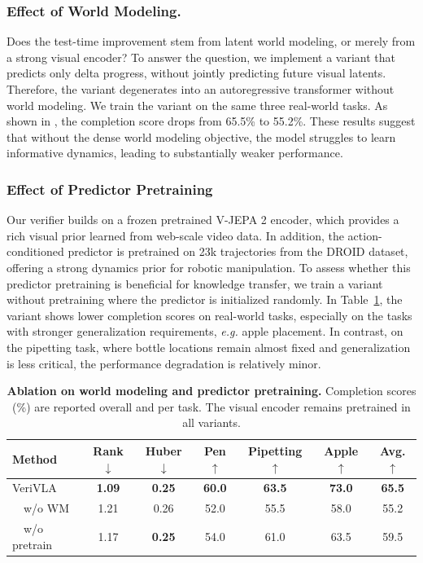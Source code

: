 \documentclass[10pt,twocolumn,letterpaper]{article}
\begin{document}
\subsubsection{Effect of World Modeling.}

Does the test-time improvement stem from latent world modeling, or merely from a strong visual encoder? To answer the question, we implement a variant that predicts only delta progress, without jointly predicting future visual latents. Therefore, the variant degenerates into an autoregressive transformer without world modeling.
We train the variant on the same three real-world tasks. As shown in , the completion score drops from 65.5\% to 55.2\%. These results suggest that without the dense world modeling objective, the model struggles to learn informative dynamics, leading to substantially weaker performance.


\subsubsection{Effect of Predictor Pretraining}
Our verifier builds on a frozen pretrained V-JEPA 2 encoder, which provides a rich visual prior learned from web-scale video data. In addition, the action-conditioned predictor is pretrained on 23k trajectories from the DROID dataset, offering a strong dynamics prior for robotic manipulation. To assess whether this predictor pretraining is beneficial for knowledge transfer, we train a variant without pretraining where the predictor is initialized randomly.
In Table~\ref{tab:ablation}, the variant shows lower completion scores on real-world tasks, especially on the tasks with stronger generalization requirements, \textit{e.g.} apple placement. In contrast, on the pipetting task, where bottle locations remain almost fixed and generalization is less critical, the performance degradation is relatively minor.

\begin{table}[h]
\centering
\small
\setlength{\tabcolsep}{1.25pt}
\caption{\textbf{Ablation on world modeling and predictor pretraining.} Completion scores (\%) are reported overall and per task. The visual encoder remains pretrained in all variants.}
\label{tab:ablation}
\begin{tabular}{lcccccc}
\toprule
Method & Rank $\downarrow$ & Huber $\downarrow$ & Pen $\uparrow$ & Pipetting $\uparrow$ & Apple $\uparrow$ & Avg. $\uparrow$ \\
\midrule
\rowcolor{gray!15}
VeriVLA & \textbf{1.09} & \textbf{0.25} & \textbf{60.0} & \textbf{63.5} & \textbf{73.0} & \textbf{65.5} \\
\ \ w/o WM & 1.21 & 0.26 & 52.0 & 55.5 & 58.0 & 55.2 \\
\ \  w/o pretrain & 1.17 & \textbf{0.25} & 54.0 & 61.0 & 63.5 & 59.5 \\
\bottomrule
\end{tabular}
\end{table}
\end{document}
